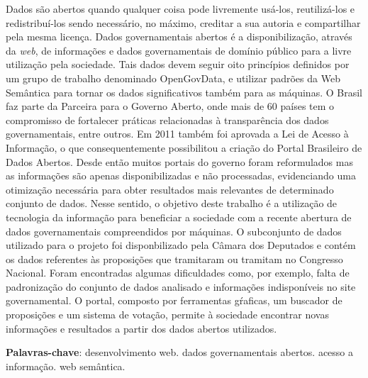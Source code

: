 \documentclass[
	12pt,				%
	openright,			%
	twoside,			%
	a4paper,			%
	english,			%
	french,				%
	spanish,			%
	brazil				%
	]{abntex2}
\begin{document}
\setlength{\absparsep}{18pt} %
\begin{resumo}

Dados são abertos quando qualquer coisa pode livremente usá-los, reutilizá-los e redistribuí-los sendo necessário, 
no máximo, creditar a sua autoria e compartilhar pela mesma licença. Dados governamentais abertos é a disponibilização,
através da \emph{web}, de informações e dados governamentais de domínio público para a livre utilização pela sociedade. Tais dados 
devem seguir oito princípios definidos por um grupo de trabalho denominado OpenGovData, e utilizar padrões da Web Semântica 
para tornar os dados significativos também para as máquinas. O Brasil faz parte da Parceira para o Governo Aberto, onde mais 
de 60 países tem o compromisso de fortalecer práticas relacionadas à transparência dos dados governamentais, entre outros. Em 
2011 também foi aprovada a Lei de Acesso à Informação, o que consequentemente possibilitou a criação do Portal Brasileiro de 
Dados Abertos. Desde então muitos portais do governo foram reformulados mas as informações são apenas disponibilizadas e não
processadas, evidenciando uma otimização necessária para obter resultados mais relevantes de determinado conjunto de dados. 
Nesse sentido, o objetivo deste trabalho é a utilização de tecnologia da informação para beneficiar a sociedade com a recente
abertura de dados governamentais compreendidos por máquinas. O subconjunto de dados utilizado para o projeto foi disponbilizado
pela Câmara dos Deputados e contém os dados referentes às proposições que tramitaram ou tramitam no Congresso Nacional. Foram
encontradas algumas dificuldades como, por exemplo, falta de padronização do conjunto de dados analisado e informações 
indisponíveis no site governamental. O portal, composto por ferramentas gŕaficas, um buscador de proposições e um sistema de 
votação, permite à sociedade encontrar novas informações e resultados a partir dos dados abertos utilizados.

 \textbf{Palavras-chave}: desenvolvimento web. dados governamentais abertos. acesso a informação. web semântica.
\end{resumo}
\end{document}
